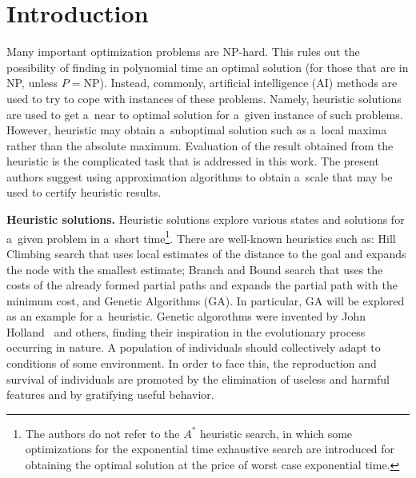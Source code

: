 




      \thispagestyle{myheadings}

      \begin{multicols}{2}

                  \label{st\stat}

\section{Introduction}

\noindent
Many important optimization problems are NP-hard. This rules out the possibility of finding in polynomial
time an optimal solution (for those that are in NP,
unless $P=\mathrm{NP}$). Instead, commonly, artificial
intelligence (AI) methods are used to try to cope with instances of these
problems. Namely, heuristic solutions are used to get a~near to optimal
solution for a~given instance of such problems. However, heuristic
may obtain a~suboptimal solution such as a~local maxima
rather than the absolute maximum. Evaluation of the result obtained
from the heuristic is the complicated task that is addressed in this
work. The present authors suggest using approximation algorithms to obtain a~scale
that may be used to certify heuristic results.

\noindent
\textbf{Heuristic solutions.} Heuristic solutions explore
various states and solutions
for a~given problem in a~short time\footnote[2]{The authors do not
refer to
the $A^*$ heuristic search, in which some optimizations for the exponential
time exhaustive search are introduced for obtaining the
optimal solution at the price of worst case exponential time.}.
There are well-known heuristics such as:
Hill Climbing search that uses local
estimates of the distance to the goal and expands the node with the
smallest estimate; Branch and Bound search that uses the costs of the
already formed partial paths and expands the partial path with the
minimum cost, and {Genetic Algorithms (GA)}.
In particular,  GA  will be explored
as an example for a~heuristic. Genetic algorothms were invented by John
Holland~\cite{H1971} and others, finding their inspiration in the
evolutionary process occurring in nature. A population of
individuals should collectively adapt to conditions of some
environment. In order to face this, the reproduction and survival of
individuals are promoted by the elimination of useless and harmful
features and by gratifying useful behavior.


\end{multicols}
